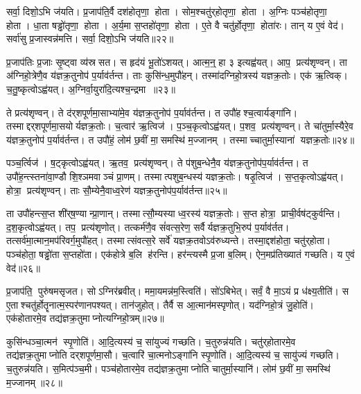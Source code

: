 सर्वा॒ दिशो॒ऽभि ज॑यति।
प्र॒जाप॑ति॒र्वै दश॑होतृणा॒ होता।
सोम॒श्चतु॑र्‌होतृणा॒ होता।
अ॒ग्निः पञ्च॑होतृणा॒ होता।
धा॒ता षड्ढो॑तृणा॒ होता।
अ॒र्य॒मा स॒प्तहो॑तृणा॒ होता।
ए॒ते वै चतु॑र्\mbox{}होतृणा॒ होता॑रः।
तान् य ए॒वं वेद॑।
सर्वा॑सु प्र॒जास्वन्न॑मत्ति।
सर्वा॒ दिशो॒ऽभि ज॑यति॥२२॥\anuvakamend[आ॒र्ध्नु॒व॒न्ना॒र्ध्नु॒व॒न्नित्ये॒वं वेदात्ति सर्वा॒ दिशो॒ऽभि ज॑यति (वै तेन॑ स॒त्रङ्केन॑ ॥ )]

प्र॒जाप॑तिः प्र॒जाः सृ॒ष्ट्वा व्य॑स्रसत।
स हृद॑यं भू॒तो॑ऽशयत्।
आत्म॒न्॒ हा ३ इत्यह्व॑यत्।
आप॒ प्रत्य॑शृण्वन्।
ता अ॑ग्निहो॒त्रेणै॒व य॑ज्ञक्र॒तुनोप॑ प॒र्याव॑र्तन्त।
ताः कुसि॑न्ध॒मुपौ॑हन्।
तस्मा॑दग्निहो॒त्रस्य॑ यज्ञक्र॒तोः।
एक॑ ऋ॒त्विक्।
च॒तु॒ष्कृत्वोऽह्व॑यत्।
अ॒ग्निर्वा॒युरा॑दि॒त्यश्च॒न्द्रमा॥२३॥

ते प्रत्य॑शृण्वन्।
ते द॑र्‌शपूर्णमा॒साभ्या॑मे॒व य॑ज्ञक्र॒तुनोप॑ प॒र्याव॑र्तन्त।
त उपौ॑हश्च॒त्वार्यङ्गा॑नि।
तस्माद्दर्‌शपूर्णमा॒सयोर्यज्ञक्र॒तोः।
च॒त्वार॑ ऋ॒त्विज॑।
प॒ञ्च॒कृत्वोऽह्व॑यत्।
प॒शव॒ प्रत्य॑शृण्वन्।
ते चा॑तुर्मा॒स्यैरे॒व य॑ज्ञक्र॒तुनोप॑ प॒र्याव॑र्तन्त।
त उपौ॑हं॒ लोम॑ छ॒वीं मा॒समस्थि॑ म॒ज्जानम्।
तस्माच्चातुर्मा॒स्याना॑ यज्ञक्र॒तोः॥२४॥

पञ्च॒र्त्विज॑।
ष॒ट्कृत्वोऽह्व॑यत्।
ऋ॒तव॒ प्रत्य॑शृण्वन्।
ते प॑शुब॒न्धेनै॒व य॑ज्ञक्र॒तुनोप॑प॒र्याव॑र्तन्त।
त उपौ॑ह॒न्त्स्तना॑वा॒ण्डौ शि॒श्ञमवाञ्चं प्रा॒णम्।
तस्मात्पशुब॒न्धस्य॑ यज्ञक्र॒तोः।
षडृ॒त्विज॑।
स॒प्त॒कृत्वोऽह्व॑यत्।
होत्रा॒ प्रत्य॑शृण्वन्।
ताः सौ॒म्येनै॒वाध्व॒रेण॑ यज्ञक्र॒तुनोप॑प॒र्याव॑र्तन्त॥२५॥

ता उपौ॑हन्त्स॒प्त शी॑र्‌ष॒ण्यान्प्रा॒णान्।
तस्मात्सौ॒म्यस्याध्व॒रस्य॑ यज्ञक्र॒तोः।
स॒प्त होत्रा॒ प्राची॒र्वष॑ट्कुर्वन्ति।
द॒श॒कृत्वोऽह्व॑यत्।
तप॒ प्रत्य॑शृणोत्।
तत्कर्म॑णै॒व सं॑वत्स॒रेण॒ सर्वैर्यज्ञक्र॒तुभि॒रुप॑ प॒र्याव॑र्तत।
तत्सर्व॑मा॒त्मान॒मप॑रिवर्ग॒मुपौ॑हत्।
तस्मात्संवत्स॒रे सर्वे॑ यज्ञक्र॒तवोऽव॑रुध्यन्ते।
तस्मा॒द्दश॑होता॒ चतु॑र्‌होता।
पञ्च॑होता॒ षड्ढो॑ता स॒प्तहो॑ता।
एक॑होत्रे ब॒लि ह॑रन्ति।
हर॑न्त्यस्मै प्र॒जा ब॒लिम्।
ऐन॒मप्र॑तिख्यातं गच्छति।
य ए॒वं वेद॑॥२६॥\anuvakamend[च॒न्द्रमाश्चातुर्मा॒स्यानां यज्ञक्र॒तोर॑ध्व॒रेण॑ यज्ञक्र॒तुनोप॑ प॒र्याव॑र्तन्त स॒प्तहो॑ता च॒त्वारि॑ च]

प्र॒जाप॑ति॒ पुरु॑षमसृजत।
सोऽग्निर॑ब्रवीत्।
ममा॒यमन्न॑म॒स्त्विति॑।
सो॑ऽबिभेत्।
सर्वं॒ वै मा॒ऽयं प्र ध॑क्ष्य॒तीति॑।
स ए॒ताश्चतु॑र्\mbox{}होतॄनात्म॒स्पर॑णानपश्यत्।
तान॑जुहोत्।
तैर्वै स आ॒त्मान॑मस्पृणोत्।
यद॑ग्निहो॒त्रं जु॒होति॑।
एक॑होतारमे॒व तद्य॑ज्ञक्र॒तुमाप्नोत्यग्निहो॒त्रम्॥२७॥

कुसि॑न्धञ्चा॒त्मन॑ स्पृ॒णोति॑।
आ॒दि॒त्यस्य॑ च॒ सा॑युज्यं गच्छति।
च॒तुरुन्न॑यति।
चतु॑र्‌होतारमे॒व तद्य॑ज्ञक्र॒तुमाप्नोति दर्‌शपूर्णमा॒सौ।
च॒त्वारि॑ चा॒त्मनोऽङ्गा॑नि स्पृ॒णोति॑।
आ॒दि॒त्यस्य॑ च॒ सायु॑ज्यं गच्छति।
च॒तुरुन्न॑यति।
स॒मित्प॑ञ्च॒मी।
पञ्च॑होतारमे॒व तद्य॑ज्ञक्र॒तुमाप्नोति चातुर्मा॒स्यानि॑।
लोम॑ छ॒वीं मा॒समस्थि॑ म॒ज्जानम्॥२८॥

